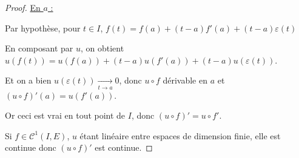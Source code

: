 
\begin{proof}
    \uline{En $a$ :}

    Par hypothèse, pour $t \in I$, $f(t) = f(a) + (t-a)f'(a) + (t-a)\varepsilon(t)$

    En composant par $u$, on obtient $u(f(t)) = u(f(a)) + (t-a)u(f'(a)) + (t-a)u(\varepsilon(t))$.

    Et on a bien $u(\varepsilon(t)) \xrightarrow[t \to a]{} 0$, donc $u \circ f$ dérivable en $a$ et $(u \circ f)'(a) = u(f'(a))$.

    Or ceci est vrai en tout point de $I$, donc $(u \circ f)' = u \circ f'$.

    Si $f \in \mathscr C^1(I, E)$, $u$ étant linéaire entre espaces de dimension finie, elle est continue donc $(u \circ f)'$ 
    est continue. 
\end{proof}

